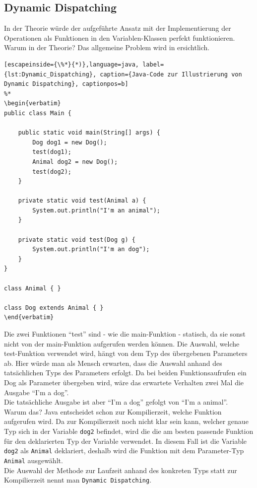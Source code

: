 \subsection{Dynamic Dispatching}
In der Theorie würde der aufgeführte Ansatz mit der Implementierung der Operationen als Funktionen in den Variablen-Klassen perfekt funktionieren.\\
Warum in der Theorie?
Das allgemeine Problem wird in  ersichtlich.

\begin{lstlisting}[escapeinside={\%*}{*)},language=java, label={lst:Dynamic_Dispatching}, caption={Java-Code zur Illustrierung von Dynamic Dispatching}, captionpos=b]
%*
\begin{verbatim}
public class Main {

    public static void main(String[] args) {
        Dog dog1 = new Dog();
        test(dog1);
        Animal dog2 = new Dog();
        test(dog2);
    }

    private static void test(Animal a) {
        System.out.println("I'm an animal");
    }

    private static void test(Dog g) {
        System.out.println("I'm an dog");
    }
}

class Animal { }

class Dog extends Animal { }
\end{verbatim}
\end{lstlisting}

\noindent
Die zwei Funktionen ``test'' sind - wie die main-Funktion - statisch, da sie sonst nicht von der main-Funktion aufgerufen werden können.
Die Auswahl, welche test-Funktion verwendet wird, hängt von dem Typ des übergebenen Parameters ab.
Hier würde man als Mensch erwarten, dass die Auswahl anhand des tatsächlichen Typs des Parameters erfolgt.
Da bei beiden Funktionsaufrufen ein Dog als Parameter übergeben wird, wäre das erwartete Verhalten zwei Mal die Ausgabe ``I'm a dog''.\\
Die tatsächliche Ausgabe ist aber ``I'm a dog'' gefolgt von ``I'm a animal''.\\
Warum das?
Java entscheidet schon zur Kompilierzeit, welche Funktion aufgerufen wird.
Da zur Kompilierzeit noch nicht klar sein kann, welcher genaue Typ sich in der Variable \texttt{dog2} befindet, wird die die am besten passende Funktion für den deklarierten Typ der Variable verwendet. In diesem Fall ist die Variable \texttt{dog2} als \texttt{Animal} deklariert, deshalb wird die Funktion mit dem Parameter-Typ \texttt{Animal} ausgewählt.\\
Die Auswahl der Methode zur Laufzeit anhand des konkreten Typs statt zur Kompilierzeit nennt man \texttt{Dynamic Dispatching}.\\

